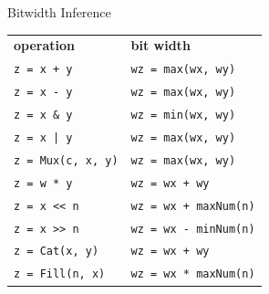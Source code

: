 \documentclass[xcolor=pdflatex,dvipsnames,table]{beamer}
\begin{document}
\begin{frame}[fragile]{Bitwidth Inference}
\begin{center}
\begin{tabular}{ll}
{\bf operation} & {\bf bit width} \\ 
\verb|z = x + y| & \verb+wz = max(wx, wy)+ \\
\verb+z = x - y+ & \verb+wz = max(wx, wy)+\\
\verb+z = x & y+ & \verb+wz = min(wx, wy)+ \\
\verb+z = x | y+ & \verb+wz = max(wx, wy)+ \\
\verb+z = Mux(c, x, y)+ & \verb+wz = max(wx, wy)+ \\
\verb+z = w * y+ & \verb!wz = wx + wy! \\
\verb+z = x << n+ & \verb!wz = wx + maxNum(n)! \\
\verb+z = x >> n+ & \verb+wz = wx - minNum(n)+ \\
\verb+z = Cat(x, y)+ & \verb!wz = wx + wy! \\
\verb+z = Fill(n, x)+ & \verb+wz = wx * maxNum(n)+ \\
\end{tabular}
\end{center}
\end{frame}

% 
% 
\end{document}
